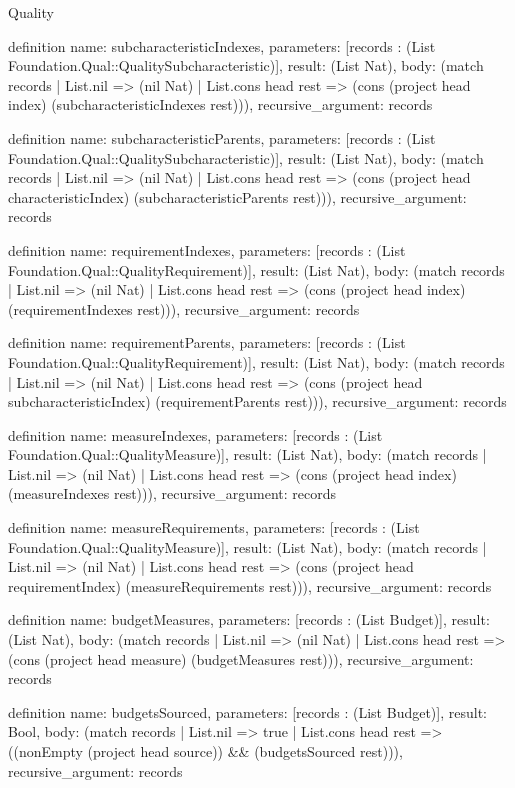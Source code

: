 \begin{lexlean}{Quality}
\begin{semanticmodule}
definition{
  name: subcharacteristicIndexes,
  parameters: [records : (List Foundation.Qual::QualitySubcharacteristic)],
  result: (List Nat),
  body: (match records
    | List.nil => (nil Nat)
    | List.cons head rest => (cons (project head index) (subcharacteristicIndexes rest))),
  recursive_argument: records
}

definition{
  name: subcharacteristicParents,
  parameters: [records : (List Foundation.Qual::QualitySubcharacteristic)],
  result: (List Nat),
  body: (match records
    | List.nil => (nil Nat)
    | List.cons head rest => (cons (project head characteristicIndex) (subcharacteristicParents rest))),
  recursive_argument: records
}

definition{
  name: requirementIndexes,
  parameters: [records : (List Foundation.Qual::QualityRequirement)],
  result: (List Nat),
  body: (match records
    | List.nil => (nil Nat)
    | List.cons head rest => (cons (project head index) (requirementIndexes rest))),
  recursive_argument: records
}

definition{
  name: requirementParents,
  parameters: [records : (List Foundation.Qual::QualityRequirement)],
  result: (List Nat),
  body: (match records
    | List.nil => (nil Nat)
    | List.cons head rest => (cons (project head subcharacteristicIndex) (requirementParents rest))),
  recursive_argument: records
}

definition{
  name: measureIndexes,
  parameters: [records : (List Foundation.Qual::QualityMeasure)],
  result: (List Nat),
  body: (match records
    | List.nil => (nil Nat)
    | List.cons head rest => (cons (project head index) (measureIndexes rest))),
  recursive_argument: records
}

definition{
  name: measureRequirements,
  parameters: [records : (List Foundation.Qual::QualityMeasure)],
  result: (List Nat),
  body: (match records
    | List.nil => (nil Nat)
    | List.cons head rest => (cons (project head requirementIndex) (measureRequirements rest))),
  recursive_argument: records
}

definition{
  name: budgetMeasures,
  parameters: [records : (List Budget)],
  result: (List Nat),
  body: (match records
    | List.nil => (nil Nat)
    | List.cons head rest => (cons (project head measure) (budgetMeasures rest))),
  recursive_argument: records
}

definition{
  name: budgetsSourced,
  parameters: [records : (List Budget)],
  result: Bool,
  body: (match records
    | List.nil => true
    | List.cons head rest => ((nonEmpty (project head source)) && (budgetsSourced rest))),
  recursive_argument: records
}


\end{semanticmodule}
\end{lexlean}

